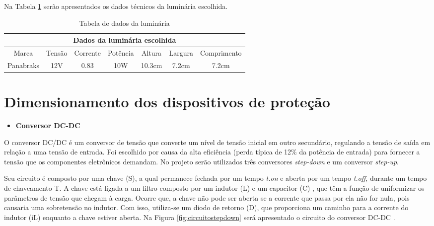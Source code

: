 Na Tabela \ref{tab:luminaria} serão apresentados os dados técnicos da luminária escolhida.

    \begin{table}[H]
    

\begin{tabular}{|c|c|c|c|c|c|c|}
\hline
\multicolumn{7}{|c|}{Dados da luminária escolhida}                                                 \\ \hline
Marca             & Tensão         & Corrente & Potência & Altura & Largura & Comprimento \\ \hline
Panabraks  & 12V  & 0.83          & 10W   & 10.3cm & 7.2cm & 7.2cm \\ \hline

\end{tabular}
    \caption{\label{tab:luminaria}Tabela de dados da luminária}
\end{table}


\section{Dimensionamento dos dispositivos de proteção}

\begin{itemize}
    \item \textbf{Conversor DC-DC}
\end{itemize}
O conversor DC/DC  é um conversor de tensão que converte um nível de tensão inicial em outro secundário, regulando a tensão de saída em relação a uma tensão de entrada. Foi escolhido por causa da alta eficiência (perda típica de 12\% da potência de entrada) para fornecer a tensão que os componentes eletrônicos demandam. No projeto serão utilizados três conversores \textit{step-down} e um conversor \textit{step-up}.
    
Seu circuito é composto por uma chave (S), a qual permanece fechada por um tempo \textit{t.on} e aberta por um tempo \textit{t.off}, durante um tempo de chaveamento T. A chave está ligada a um filtro composto por um indutor (L) e um capacitor (C) , que têm a função de uniformizar os parâmetros de tensão que chegam à carga. Ocorre que, a chave não pode ser aberta se a corrente que passa por ela não for nula, pois causaria uma sobretensão no indutor. Com isso, utiliza-se um diodo de retorno (D), que proporciona um caminho para a corrente do indutor (iL) enquanto a chave estiver aberta. Na Figura \ref{fig:circuitostepdown} será apresentado o circuito do conversor DC-DC \cite{Amauri}.

